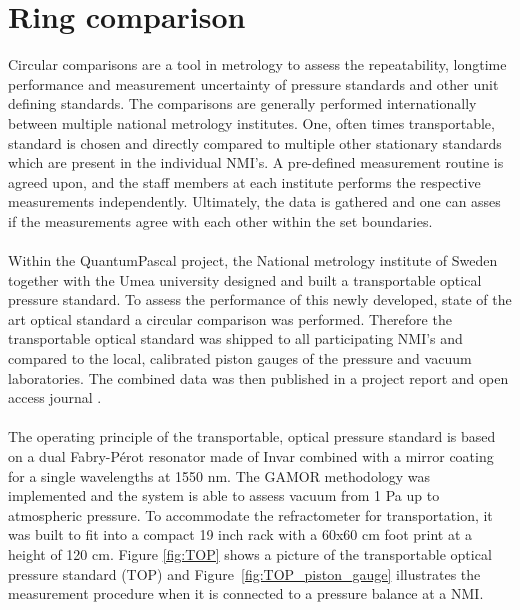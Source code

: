 \section{Ring comparison}
Circular comparisons are a tool in metrology to assess the repeatability, longtime performance and measurement uncertainty of pressure standards and other unit defining standards. The comparisons are generally performed internationally between multiple national metrology institutes. One, often times transportable, standard is chosen and directly compared to multiple other stationary standards which are present in the individual NMI's. A pre-defined measurement routine is agreed upon, and the staff members at each institute performs the respective measurements independently. Ultimately, the data is gathered and one can asses if the measurements agree with each other within the set boundaries.\\\\
Within the QuantumPascal project, the National metrology institute of Sweden together with the Umea university designed and built a transportable optical pressure standard. To assess the performance of this newly developed, state of the art optical standard a circular comparison was performed. Therefore the transportable optical standard was shipped to all participating NMI's and compared to the local, calibrated piston gauges of the pressure and vacuum laboratories. The combined data was then published in a project report \cite{label} and open access journal \cite{label}. \\\\
The operating principle of the transportable, optical pressure standard is based on a dual Fabry-Pérot resonator made of Invar combined with a mirror coating for a single wavelengths at 1550 nm. The GAMOR methodology was implemented and the system is able to assess vacuum from 1 Pa up to atmospheric pressure. To accommodate the refractometer for transportation, it was built to fit into a compact 19 inch rack with a 60x60 cm foot print at a height of 120 cm.
Figure \ref{fig:TOP} shows a picture of the transportable optical pressure standard (TOP) and \mbox{Figure \ref{fig:TOP_piston_gauge}} illustrates the measurement procedure when it is connected to a pressure balance at a NMI.\\\\
